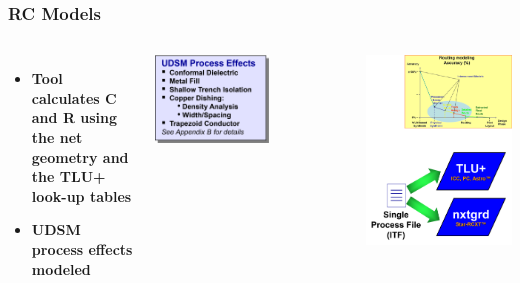 \documentclass[compress]{beamer}
\begin{document}
\begin{frame}
	\frametitle{RC Models}
	\begin{columns}	
		\begin{itemize}
			\item \textbf{Tool calculates C and R using the net geometry and the TLU+ look-up tables
			}
			\item \textbf{UDSM process effects modeled}
		\end{itemize}
		\begin{center}
			\includegraphics[width=0.6\textwidth]{UDSM}
		\end{center}
		\begin{center}
			\includegraphics[width=0.8 \textwidth]{TLU}
		\end{center}
	\end{columns}
\end{frame}
\end{document}
